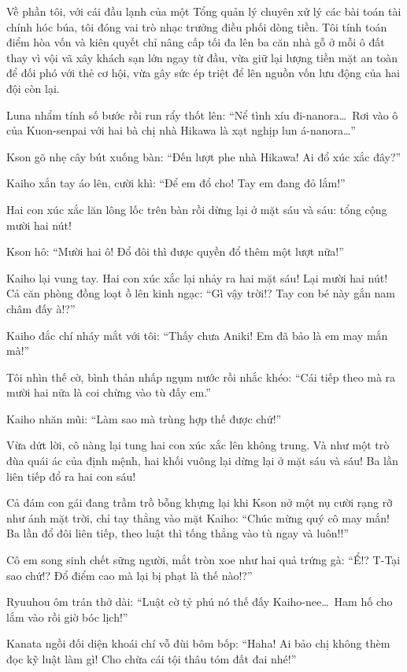 \documentclass[../main.tex]{subfiles}
\begin{document}
Về phần tôi, với cái đầu lạnh của một Tổng quản lý chuyên xử lý các bài toán tài chính hóc búa, tôi đóng vai trò nhạc trưởng điều phối dòng tiền. Tôi tính toán điểm hòa vốn và kiên quyết chỉ nâng cấp tối đa lên ba căn nhà gỗ ở mỗi ô đất thay vì vội vã xây khách sạn lớn ngay từ đầu, vừa giữ lại lượng tiền mặt an toàn để đối phó với thẻ cơ hội, vừa gây sức ép triệt để lên nguồn vốn lưu động của hai đội còn lại.

Luna nhẩm tính số bước rồi run rẩy thốt lên: ``Nể tình xíu đi-nanora\dots\ Rơi vào ô của Kuon-senpai với hai bà chị nhà Hikawa là xạt nghịp lun á-nanora\dots''

Kson gõ nhẹ cây bút xuống bàn: ``Đến lượt phe nhà Hikawa! Ai đổ xúc xắc đây?''

Kaiho xắn tay áo lên, cười khì: ``Để em đổ cho! Tay em đang đỏ lắm!''

Hai con xúc xắc lăn lông lốc trên bàn rồi dừng lại ở mặt sáu và sáu: tổng cộng mười hai nút!

Kson hô: ``Mười hai ô! Đổ đôi thì được quyền đổ thêm một lượt nữa!''

Kaiho lại vung tay. Hai con xúc xắc lại nhảy ra hai mặt sáu! Lại mười hai nút! Cả căn phòng đồng loạt ồ lên kinh ngạc: ``Gì vậy trời!? Tay con bé này gắn nam châm đấy à!?''

Kaiho đắc chí nháy mắt với tôi: ``Thấy chưa Aniki! Em đã bảo là em may mắn mà!''

Tôi nhìn thế cờ, bình thản nhấp ngụm nước rồi nhắc khéo: ``Cái tiếp theo mà ra mười hai nữa là coi chừng vào tù đấy em.''

Kaiho nhăn mũi: ``Làm sao mà trùng hợp thế được chứ!''

Vừa dứt lời, cô nàng lại tung hai con xúc xắc lên không trung. Và như một trò đùa quái ác của định mệnh, hai khối vuông lại dừng lại ở mặt sáu và sáu! Ba lần liên tiếp đổ ra hai con sáu!

Cả đám con gái đang trầm trồ bỗng khựng lại khi Kson nở một nụ cười rạng rỡ như ánh mặt trời, chỉ tay thẳng vào mặt Kaiho: ``Chúc mừng quý cô may mắn! Ba lần đổ đôi liên tiếp, theo luật thì tống thẳng vào tù ngay và luôn!!''

Cô em song sinh chết sững người, mắt tròn xoe như hai quả trứng gà: ``Ể!? T-Tại sao chứ!? Đổ điểm cao mà lại bị phạt là thế nào!?''

Ryuuhou ôm trán thở dài: ``Luật cờ tỷ phú nó thế đấy Kaiho-nee\dots\ Ham hố cho lắm vào rồi giờ bóc lịch!''

Kanata ngồi đối diện khoái chí vỗ đùi bôm bốp: ``Haha! Ai bảo chị không thèm đọc kỹ luật làm gì! Cho chừa cái tội thâu tóm đất đai nhé!''
\end{document}
